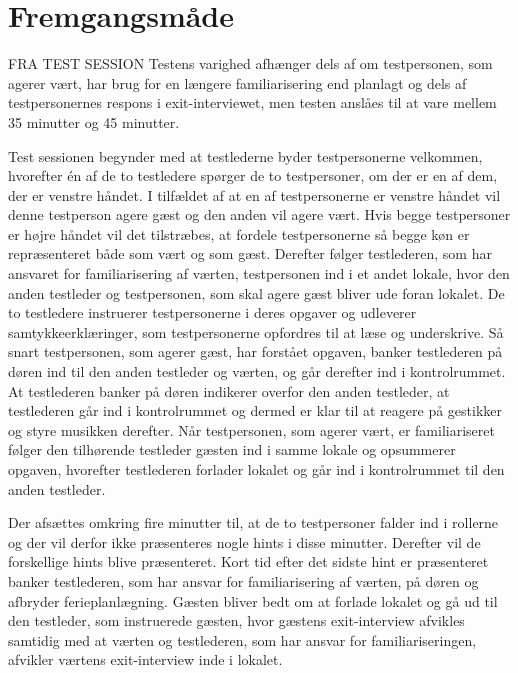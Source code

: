 \section{Fremgangsmåde}
\label{FremgangsmaadeSocialAccept}
%


FRA TEST SESSION
Testens varighed afhænger dels af om testpersonen, som agerer vært, har brug for en længere familiarisering end planlagt og dels af testpersonernes respons i exit-interviewet, men testen anslåes til at vare mellem 35 minutter og 45 minutter. 

Test sessionen begynder med at testlederne byder testpersonerne velkommen, hvorefter én af de to testledere spørger de to testpersoner, om der er en af dem, der er venstre håndet. I tilfældet af at en af testpersonerne er venstre håndet vil denne testperson agere gæst og den anden vil agere vært. Hvis begge testpersoner er højre håndet vil det tilstræbes, at fordele testpersonerne så begge køn er repræsenteret både som vært og som gæst. Derefter følger testlederen, som har ansvaret for familiarisering af værten, testpersonen ind i et andet lokale, hvor den anden testleder og testpersonen, som skal agere gæst bliver ude foran lokalet. De to testledere instruerer testpersonerne i deres opgaver og udleverer samtykkeerklæringer, som testpersonerne opfordres til at læse og underskrive. Så snart testpersonen, som agerer gæst, har forstået opgaven, banker testlederen på døren ind til den anden testleder og værten, og går derefter ind i kontrolrummet. At testlederen banker på døren indikerer overfor den anden testleder, at testlederen går ind i kontrolrummet og dermed er klar til at reagere på gestikker og styre musikken derefter. Når testpersonen, som agerer vært, er familiariseret følger den tilhørende testleder gæsten ind i samme lokale og opsummerer opgaven, hvorefter testlederen forlader lokalet og går ind i kontrolrummet til den anden testleder. 

Der afsættes omkring fire minutter til, at de to testpersoner falder ind i rollerne og der vil derfor ikke præsenteres nogle hints i disse minutter. Derefter vil de forskellige hints blive præsenteret. Kort tid efter det sidste hint er præsenteret banker testlederen, som har ansvar for familiarisering af værten, på døren og afbryder ferieplanlægning. Gæsten bliver bedt om at forlade lokalet og gå ud til den testleder, som instruerede gæsten, hvor gæstens exit-interview afvikles samtidig med at værten og testlederen, som har ansvar for familiariseringen, afvikler værtens exit-interview inde i lokalet. 


